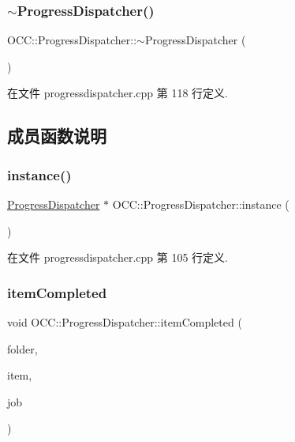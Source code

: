 \subsubsection{\texorpdfstring{$\sim$\+Progress\+Dispatcher()}{~ProgressDispatcher()}}
{\footnotesize\ttfamily O\+C\+C\+::\+Progress\+Dispatcher\+::$\sim$\+Progress\+Dispatcher (\begin{DoxyParamCaption}{ }\end{DoxyParamCaption})}



在文件 progressdispatcher.\+cpp 第 118 行定义.



\subsection{成员函数说明}
\mbox{\label{class_o_c_c_1_1_progress_dispatcher_a6dd53f3687102876817946fe6c545cd7}} 
\subsubsection{\texorpdfstring{instance()}{instance()}}
{\footnotesize\ttfamily \hyperlink{class_o_c_c_1_1_progress_dispatcher}{Progress\+Dispatcher} $\ast$ O\+C\+C\+::\+Progress\+Dispatcher\+::instance (\begin{DoxyParamCaption}{ }\end{DoxyParamCaption})\hspace{0.3cm}{\ttfamily [static]}}



在文件 progressdispatcher.\+cpp 第 105 行定义.

\mbox{\label{class_o_c_c_1_1_progress_dispatcher_a4be47980c06beb15d8486d0b1214859b}} 
\subsubsection{\texorpdfstring{item\+Completed}{itemCompleted}}
{\footnotesize\ttfamily void O\+C\+C\+::\+Progress\+Dispatcher\+::item\+Completed (\begin{DoxyParamCaption}\item[{const Q\+String \&}]{folder,  }\item[{const \hyperlink{class_o_c_c_1_1_sync_file_item}{Sync\+File\+Item} \&}]{item,  }\item[{const \hyperlink{class_o_c_c_1_1_propagator_job}{Propagator\+Job} \&}]{job }\end{DoxyParamCaption})\hspace{0.3cm}{\ttfamily [signal]}}



